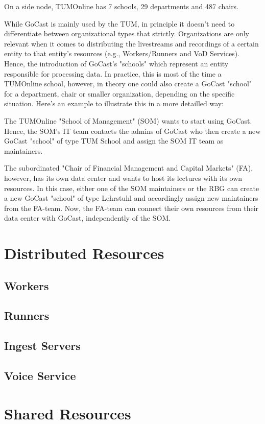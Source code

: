 On a side node, TUMOnline has 7 schools, 29 departments and 487 chairs.

While GoCast is mainly used by the TUM, in principle it doesn't need to differentiate between organizational types that strictly. Organizations are only relevant when it comes to distributing the livestreams and recordings of a certain entity to that entity's resources (e.g., Workers/Runners and VoD Services). Hence, the introduction of GoCast's "schools" which represent an entity responsible for processing data. In practice, this is most of the time a TUMOnline school, however, in theory one could also create a GoCast "school" for a department, chair or smaller organization, depending on the specific situation.
Here's an example to illustrate this in a more detailled way:

    The TUMOnline "School of Management" (SOM) wants to start using GoCast. Hence, the SOM's IT team contacts the admins of GoCast who then create a new GoCast "school" of type TUM School and assign the SOM IT team as maintainers.

    The subordinated "Chair of Financial Management and Capital Markets" (FA), however, has its own data center and wants to host its lectures with its own resources. In this case, either one of the SOM maintainers or the RBG can create a new GoCast "school" of type Lehrstuhl and accordingly assign new maintainers from the FA-team. Now, the FA-team can connect their own resources from their data center with GoCast, independently of the SOM.

\section{Distributed Resources}



\subsection{Workers}
\subsection{Runners}
\subsection{Ingest Servers}
\subsection{Voice Service}

\section{Shared Resources}
